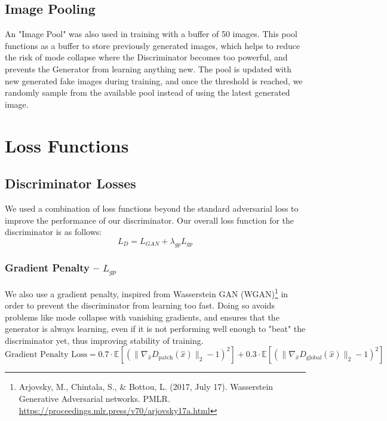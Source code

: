 \documentclass[twoside,english,notitlepage]{report}
\begin{document}
\newpage
\subsection{Image Pooling}\label{task1:image-pooling}
An "Image Pool" was also used in training with a buffer of 50 images. This pool functions as a buffer to store previously generated images, which helps to reduce the risk of mode collapse where the Discriminator becomes too powerful, and prevents the Generator from learning anything new. The pool is updated with new generated fake images during training, and once the threshold is reached, we randomly sample from the available pool instead of using the latest generated image. 

\section{Loss Functions}\label{task1:losses}

\subsection{Discriminator Losses}
We used a combination of loss functions beyond the standard adversarial loss to improve the performance of our discriminator. Our overall loss function for the discriminator is as follows:
\begin{equation}
    L_{D} = L_{GAN} + \lambda_{gp} L_{gp}
\end{equation}

\subsubsection{Gradient Penalty – $L_{gp}$}
We also use a gradient penalty, inspired from Wasserstein GAN (WGAN)\footnote{Arjovsky, M., Chintala, S., \& Bottou, L. (2017, July 17). Wasserstein Generative Adversarial networks. PMLR. \href{https://proceedings.mlr.press/v70/arjovsky17a.html}{https://proceedings.mlr.press/v70/arjovsky17a.html}} in order to prevent the discriminator from learning too fast. Doing so avoids problems like mode collapse with vanishing gradients, and ensures that the generator is always learning, even if it is not performing well enough to "beat" the discriminator yet, thus improving stability of training.
\begin{equation*}
    \text{Gradient Penalty Loss} = 0.7 \cdot \mathbb{E} \left[ \left( \| \nabla_{\hat{x}} D_{\text{patch}} (\hat{x}) \|_2 - 1 \right)^2 \right] + 0.3 \cdot \mathbb{E} \left[ \left( \| \nabla_{\hat{x}} D_{\text{global}} (\hat{x}) \|_2 - 1 \right)^2 \right]
\end{equation*}
\end{document}
